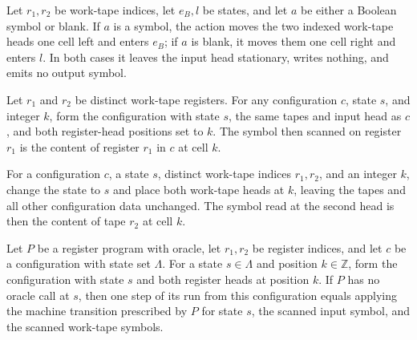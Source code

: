 \begin{definition}
\label{Complexity.LogProg.eqBAct}
\leanok
{}
Let $r_1,r_2$ be work-tape indices, let $e_B,l$ be states, and let $a$ be either a
Boolean symbol or blank. If $a$ is a symbol, the action moves the two indexed work-tape
heads one cell left and enters $e_B$; if $a$ is blank, it moves them one cell right and
enters $l$. In both cases it leaves the input head stationary, writes nothing, and emits
no output symbol.
\end{definition}

\begin{lemma}
\leanok
{}
Let $r_1$ and $r_2$ be distinct work-tape registers. For any configuration $c$, state
$s$, and integer $k$, form the configuration with state $s$, the same tapes and input
head as $c$, and both register-head positions set to $k$. The symbol then scanned on
register $r_1$ is the content of register $r_1$ in $c$ at cell $k$.
\end{lemma}

\begin{lemma}
\leanok
{}
For a configuration $c$, a state $s$, distinct work-tape indices $r_1,r_2$, and an
integer $k$, change the state to $s$ and place both work-tape heads at $k$, leaving the
tapes and all other configuration data unchanged. The symbol read at the second head is
then the content of tape $r_2$ at cell $k$.
\end{lemma}

\begin{lemma}
\label{Complexity.LogProg.rrun_one_eq}
\leanok
{}
Let $P$ be a register program with oracle, let $r_1,r_2$ be register indices, and let
$c$ be a configuration with state set $\Lambda$. For a state $s\in\Lambda$ and position
$k\in\mathbb Z$, form the configuration with state $s$ and both register heads at
position $k$. If $P$ has no oracle call at $s$, then one step of its run from this
configuration equals applying the machine transition prescribed by $P$ for state $s$,
the scanned input symbol, and the scanned work-tape symbols.
\end{lemma}

